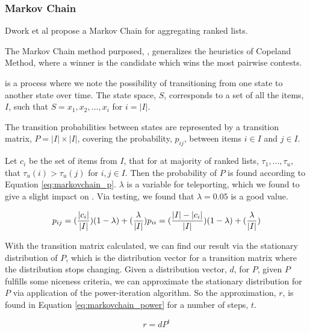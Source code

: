 \subsubsection{Markov Chain}\label{sec:markovchain}
Dwork et al propose a Markov Chain for aggregating ranked lists\cite{rank:aggregation}.

The Markov Chain method purposed, \MC, generalizes the heuristics of Copeland Method, where a winner is the candidate which wins the most pairwise contests\cite{saari1996}.

\MC is a process where we note the possibility of transitioning from one state to another state over time. The \MC state space, $S$, corresponds to a set of all the items, $I$, such that $S = {x_1, x_2,..., x_i}$ for $i = |I|$.

The transition probabilities between states are represented by a transition matrix, $P = |I| \times |I|$, covering the probability, $p_{ij}$, between items $i \in I$ and $j \in I$.

Let $c_i$ be the set of items from $I$, that for at majority of ranked lists, $\tau_1, ...,\tau_u$, that $\tau_u(i) > \tau_u(j)$ for $i,j \in I$. Then the probability of $P$ is found according to Equation \ref{eq:markovchain_p}.
$\lambda$ is a variable for teleporting, which we found to give a slight impact on . Via testing, we found that $\lambda = 0.05$ is a good value.

\begin{equation}\label{eq:markovchain_p}
p_{ij} = (\frac{|c_i|}{|I|})(1-\lambda)+(\frac{\lambda}{|I|})\\
p_{ii} = (\frac{|I|-|c_i|}{|I|})(1-\lambda)+(\frac{\lambda}{|I|})
\end{equation}

With the transition matrix calculated, we can find our result via the stationary distribution of $P$, which is the distribution vector for a transition matrix where the distribution stops changing. Given a distribution vector, $d$, for $P$, given $P$ fulfills some niceness criteria, we can approximate the stationary distribution for $P$ via application of the power-iteration algorithm. So the approximation, $r$, is found in Equation \ref{eq:markovchain_power} for a number of steps, $t$.

\begin{equation}\label{eq:markovchain_power}
r = dP^t
\end{equation}


